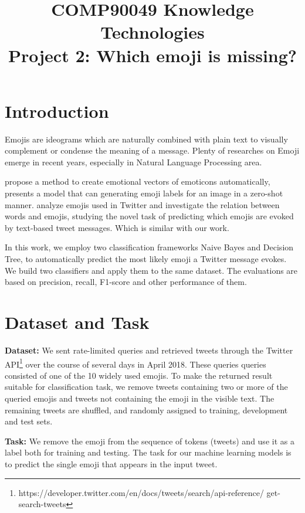 \documentclass[11pt]{article}
\title{COMP90049 Knowledge Technologies \\
	Project 2: Which emoji is missing?}
\begin{document}
\maketitle

\section{Introduction}

Emojis are ideograms which are naturally combined with plain text to visually complement or condense the meaning of a message. Plenty of researches on Emoji emerge in recent years, especially in Natural Language Processing area.

\cite{Aoki2011A} propose a method to create emotional vectors of emoticons automatically, \cite{Cappallo:2015:IZE:2733373.2806335} presents a model that can generating emoji labels for an image in a zero-shot manner. \cite{Barbieri2016What} analyze emojis used in Twitter and \cite{Barbieri2017Are} investigate the relation between words and emojis, studying the novel task of predicting which emojis are evoked by text-based tweet messages. Which is similar with our work. 

In this work, we employ two classification frameworks Naive Bayes and Decision Tree, to automatically predict the most likely emoji a Twitter message evokes. We build two classifiers and apply them to the same dataset. The evaluations are based on precision, recall, F1-score and other performance of them.

\section{Dataset and Task}

\noindent\textbf{Dataset:} We sent rate-limited queries and retrieved tweets through the Twitter API\footnote{https://developer.twitter.com/en/docs/tweets/search/api-reference/ get-search-tweets} over the course of several days in April 2018. These queries queries consisted of one of the 10 widely used emojis. To make the returned result suitable for classification task, we remove tweets containing two or more of the queried emojis and tweets not containing the emoji in the visible text. The remaining tweets are shuffled, and randomly assigned to training, development and test sets.

\noindent\textbf{Task:} We remove the emoji from the sequence of tokens (tweets) and use it as a label both for training and testing. The task for our machine learning models is to predict the single emoji that appears in the input tweet.
\end{document}
